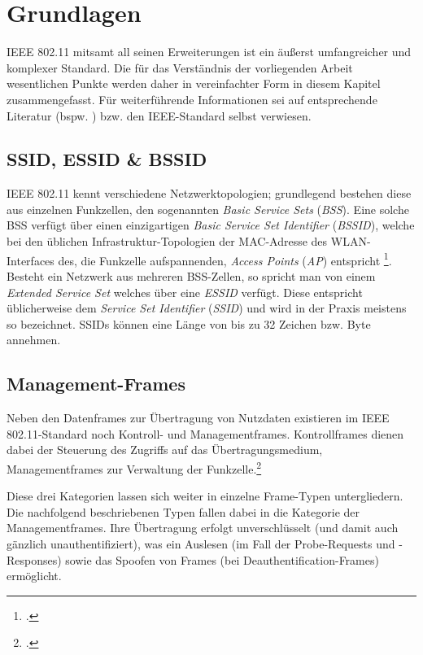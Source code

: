 \section{Grundlagen}\label{sec:grundlagen}
IEEE 802.11 mitsamt all seinen Erweiterungen ist ein äußerst umfangreicher und komplexer Standard. Die für das Verständnis der vorliegenden Arbeit wesentlichen Punkte werden daher in vereinfachter Form in diesem Kapitel zusammengefasst. Für weiterführende Informationen sei auf entsprechende Literatur (bspw. \cite{rechWLAN}) bzw. den IEEE-Standard selbst verwiesen.

\subsection{SSID, ESSID \& BSSID}
IEEE 802.11 kennt verschiedene Netzwerktopologien; grundlegend bestehen diese aus einzelnen Funkzellen, den sogenannten \textit{Basic Service Sets} (\textit{BSS}). Eine solche BSS verfügt über einen einzigartigen \textit{Basic Service Set Identifier} (\textit{BSSID}), welche bei den üblichen Infrastruktur-Topologien der MAC-Adresse des WLAN-Interfaces des, die Funkzelle aufspannenden, \textit{Access Points} (\textit{AP}) entspricht \footcite[S. 51]{rechWLAN}. Besteht ein Netzwerk aus mehreren BSS-Zellen, so spricht man von einem \textit{Extended Service Set} welches über eine \textit{ESSID} verfügt. Diese entspricht üblicherweise dem \textit{Service Set Identifier} (\textit{SSID}) und wird in der Praxis meistens so bezeichnet. SSIDs können eine Länge von bis zu 32 Zeichen bzw. Byte annehmen.\cite{netgearESSID}

\subsection{Management-Frames}
Neben den Datenframes zur Übertragung von Nutzdaten existieren im IEEE 802.11-Standard noch Kontroll- und Managementframes. Kontrollframes dienen dabei der Steuerung des Zugriffs auf das Übertragungsmedium, Managementframes zur Verwaltung der Funkzelle.\footcite[S. 180]{rechWLAN}

Diese drei Kategorien lassen sich weiter in einzelne Frame-Typen untergliedern. Die nachfolgend beschriebenen Typen fallen dabei in die Kategorie der Managementframes. Ihre Übertragung erfolgt unverschlüsselt (und damit auch gänzlich unauthentifiziert), was ein Auslesen (im Fall der Probe-Requests und -Responses) sowie das Spoofen von Frames (bei Deauthentification-Frames) ermöglicht.

